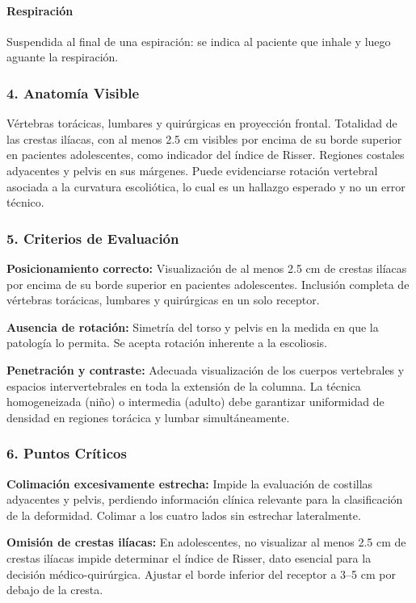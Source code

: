 	\paragraph{Respiración}
	Suspendida al final de una espiración: se indica al paciente que inhale y luego aguante la respiración.
	
	\subsubsection*{4. Anatomía Visible}
	
	Vértebras torácicas, lumbares y quirúrgicas en proyección frontal. Totalidad de las crestas ilíacas, con al menos 2.5 cm visibles por encima de su borde superior en pacientes adolescentes, como indicador del índice de Risser. Regiones costales adyacentes y pelvis en sus márgenes. Puede evidenciarse rotación vertebral asociada a la curvatura escoliótica, lo cual es un hallazgo esperado y no un error técnico.
	
	\subsubsection*{5. Criterios de Evaluación}
	
	\textbf{Posicionamiento correcto:} Visualización de al menos 2.5 cm de crestas ilíacas por encima de su borde superior en pacientes adolescentes. Inclusión completa de vértebras torácicas, lumbares y quirúrgicas en un solo receptor.
	
	\textbf{Ausencia de rotación:} Simetría del torso y pelvis en la medida en que la patología lo permita. Se acepta rotación inherente a la escoliosis.
	
	\textbf{Penetración y contraste:} Adecuada visualización de los cuerpos vertebrales y espacios intervertebrales en toda la extensión de la columna. La técnica homogeneizada (niño) o intermedia (adulto) debe garantizar uniformidad de densidad en regiones torácica y lumbar simultáneamente.
	
	\subsubsection*{6. Puntos Críticos}
	
	\textbf{Colimación excesivamente estrecha:} Impide la evaluación de costillas adyacentes y pelvis, perdiendo información clínica relevante para la clasificación de la deformidad. Colimar a los cuatro lados sin estrechar lateralmente.
	
	\textbf{Omisión de crestas ilíacas:} En adolescentes, no visualizar al menos 2.5 cm de crestas ilíacas impide determinar el índice de Risser, dato esencial para la decisión médico-quirúrgica. Ajustar el borde inferior del receptor a 3--5 cm por debajo de la cresta.
	
